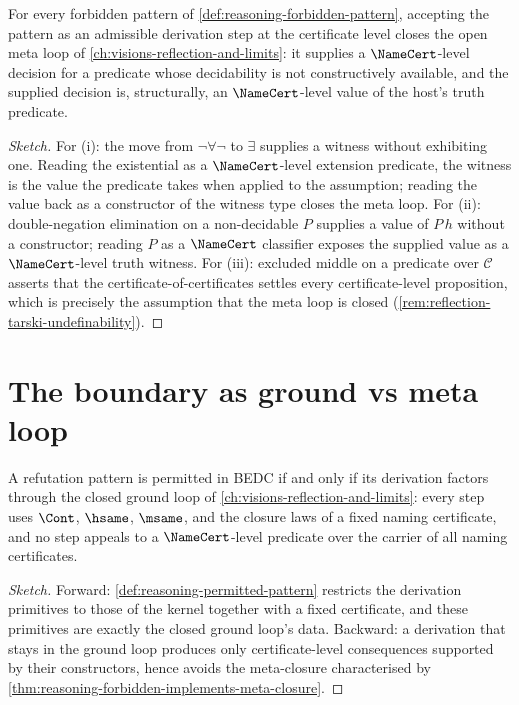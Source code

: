 \begin{theorem}
\label{thm:reasoning-forbidden-implements-meta-closure}
For every forbidden pattern of \autoref{def:reasoning-forbidden-pattern}, accepting the pattern as an admissible derivation step at the certificate level closes the open meta loop of \autoref{ch:visions-reflection-and-limits}: it supplies a $\NameCert$-level decision for a predicate whose decidability is not constructively available, and the supplied decision is, structurally, an $\NameCert$-level value of the host's truth predicate.
\end{theorem}

\begin{proof}[Sketch]
For (i): the move from $\neg \forall \neg$ to $\exists$ supplies a witness without exhibiting one. Reading the existential as a $\NameCert$-level extension predicate, the witness is the value the predicate takes when applied to the assumption; reading the value back as a constructor of the witness type closes the meta loop. For (ii): double-negation elimination on a non-decidable $P$ supplies a value of $P\,h$ without a constructor; reading $P$ as a $\NameCert$ classifier exposes the supplied value as a $\NameCert$-level truth witness. For (iii): excluded middle on a predicate over $\mathcal{C}$ asserts that the certificate-of-certificates settles every certificate-level proposition, which is precisely the assumption that the meta loop is closed (\autoref{rem:reflection-tarski-undefinability}).
\end{proof}

\section{The boundary as ground vs meta loop}
\label{sec:reasoning-boundary}

\begin{theorem}
\label{thm:reasoning-permitted-iff-ground}
A refutation pattern is permitted in BEDC if and only if its derivation factors through the closed ground loop of \autoref{ch:visions-reflection-and-limits}: every step uses $\Cont$, $\hsame$, $\msame$, and the closure laws of a fixed naming certificate, and no step appeals to a $\NameCert$-level predicate over the carrier of all naming certificates.
\end{theorem}

\begin{proof}[Sketch]
Forward: \autoref{def:reasoning-permitted-pattern} restricts the derivation primitives to those of the kernel together with a fixed certificate, and these primitives are exactly the closed ground loop's data. Backward: a derivation that stays in the ground loop produces only certificate-level consequences supported by their constructors, hence avoids the meta-closure characterised by \autoref{thm:reasoning-forbidden-implements-meta-closure}.
\end{proof}


